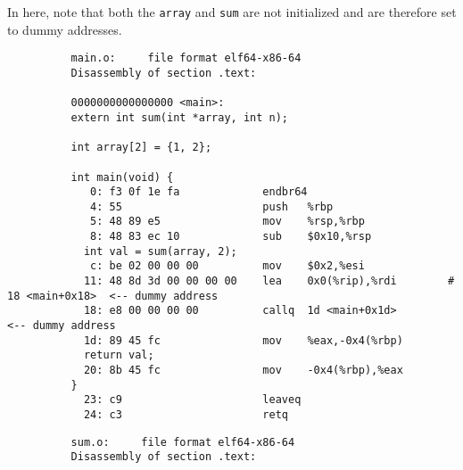       \begin{example}
        In here, note that both the \texttt{array} and \texttt{sum} are not initialized and are therefore set to dummy addresses. 
        \begin{lstlisting}
          main.o:     file format elf64-x86-64
          Disassembly of section .text:

          0000000000000000 <main>:
          extern int sum(int *array, int n); 

          int array[2] = {1, 2}; 

          int main(void) {
             0:	f3 0f 1e fa          	endbr64 
             4:	55                   	push   %rbp
             5:	48 89 e5             	mov    %rsp,%rbp
             8:	48 83 ec 10          	sub    $0x10,%rsp
            int val = sum(array, 2); 
             c:	be 02 00 00 00       	mov    $0x2,%esi
            11:	48 8d 3d 00 00 00 00 	lea    0x0(%rip),%rdi        # 18 <main+0x18>  <-- dummy address
            18:	e8 00 00 00 00       	callq  1d <main+0x1d>                          <-- dummy address
            1d:	89 45 fc             	mov    %eax,-0x4(%rbp)
            return val; 
            20:	8b 45 fc             	mov    -0x4(%rbp),%eax
          }
            23:	c9                   	leaveq 
            24:	c3                   	retq  
        \end{lstlisting}
        \begin{lstlisting}
          sum.o:     file format elf64-x86-64
          Disassembly of section .text:


\end{lstlisting}
\end{example}
